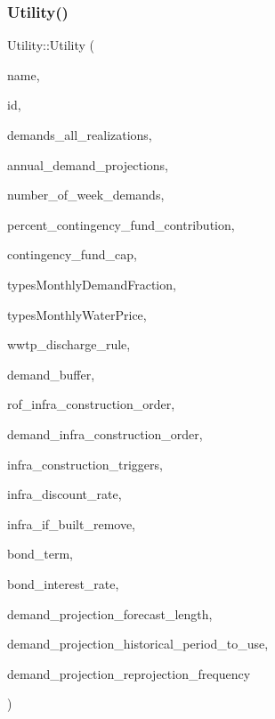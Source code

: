 \subsubsection{\texorpdfstring{Utility()}{Utility()}\hspace{0.1cm}{\footnotesize\ttfamily [3/5]}}
{\footnotesize\ttfamily Utility\+::\+Utility (\begin{DoxyParamCaption}\item[{const char $\ast$}]{name,  }\item[{int}]{id,  }\item[{vector$<$ vector$<$ double $>$$>$ \&}]{demands\+\_\+all\+\_\+realizations,  }\item[{vector$<$ double $>$ \&}]{annual\+\_\+demand\+\_\+projections,  }\item[{int}]{number\+\_\+of\+\_\+week\+\_\+demands,  }\item[{const double}]{percent\+\_\+contingency\+\_\+fund\+\_\+contribution,  }\item[{const double}]{contingency\+\_\+fund\+\_\+cap,  }\item[{const vector$<$ vector$<$ double $>$$>$ \&}]{types\+Monthly\+Demand\+Fraction,  }\item[{const vector$<$ vector$<$ double $>$$>$ \&}]{types\+Monthly\+Water\+Price,  }\item[{\mbox{\hyperlink{classWwtpDischargeRule}{Wwtp\+Discharge\+Rule}}}]{wwtp\+\_\+discharge\+\_\+rule,  }\item[{double}]{demand\+\_\+buffer,  }\item[{const vector$<$ int $>$ \&}]{rof\+\_\+infra\+\_\+construction\+\_\+order,  }\item[{const vector$<$ int $>$ \&}]{demand\+\_\+infra\+\_\+construction\+\_\+order,  }\item[{const vector$<$ double $>$ \&}]{infra\+\_\+construction\+\_\+triggers,  }\item[{double}]{infra\+\_\+discount\+\_\+rate,  }\item[{const vector$<$ vector$<$ int $>$$>$ \&}]{infra\+\_\+if\+\_\+built\+\_\+remove,  }\item[{double}]{bond\+\_\+term,  }\item[{double}]{bond\+\_\+interest\+\_\+rate,  }\item[{int}]{demand\+\_\+projection\+\_\+forecast\+\_\+length,  }\item[{int}]{demand\+\_\+projection\+\_\+historical\+\_\+period\+\_\+to\+\_\+use,  }\item[{int}]{demand\+\_\+projection\+\_\+reprojection\+\_\+frequency }\end{DoxyParamCaption})}



